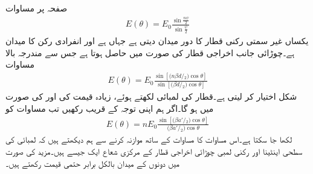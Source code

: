 صفحہ  پر مساوات 
\begin{align*}
E(\theta)=E_0 \frac{\sin \frac{n\psi}{2}}{\sin \frac{\psi}{2}}
\end{align*}
یکساں غیر سمتی  رکنی قطار کا دور میدان دیتی ہے جہاں  ہے اور  انفرادی رکن کا میدان ہے۔چوڑائی جانب اخراجی قطار  کی صورت میں حاصل ہوتا ہے جس سے مندرجہ بالا مساوات 
\begin{align}\label{مساوات_اینٹینا_چوڑائی_دوبارہ_الف}
E(\theta)=E_0 \frac{\sin [{(n \beta d}\!/\!_2)\cos \theta ]}{\sin [{(\beta d}\!/\!_2)\cos \theta ]}
\end{align}
شکل اختیار کر لیتی ہے۔قطار کی لمبائی  لکھتے ہوئے، زیادہ قیمت کی  اور  کی صورت میں  ہو گا۔اگر ہم اپنی توجہ  کے قریب رکھیں تب مساوات  کو 
\begin{align}
E(\theta)= n E_0 \frac{\sin [{( \beta a'}\!/\!_2)\cos \theta ]}{{(\beta a'}\!/\!_2)\cos \theta }
\end{align}
لکھا جا سکتا ہے۔اس مساوات کا مساوات  کے ساتھ موازنہ کرنے سے ہم دیکھتے ہیں کہ  لمبائی کی سطحی اینٹینا اور  رکنی  لمبی چوڑائی اخراجی قطار  کے مرکزی شعاع ایک جیسے ہیں۔مزید  کی صورت میں دونوں کے میدان بالکل برابر حتمی قیمت رکھتے ہیں۔

